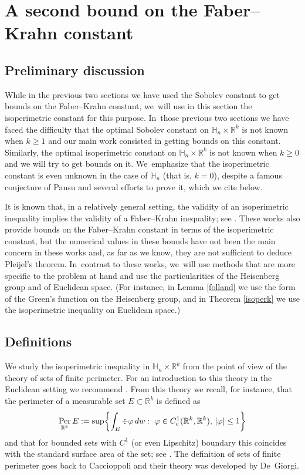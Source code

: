 \documentclass[10pt]{amsart}
\newcommand{\rc}{\textup{c}}
\theoremstyle{definition}
\let\phi\varphi
\newcommand{\1}{\mathbbm{1}}
\newcommand{\R}{\mathbb{R}}
\DeclareMathOperator{\per}{Per}
\begin{document}
\section{A second bound on the Faber--Krahn constant}\label{sec:isoperimetric}

\subsection{Preliminary discussion}
While in the previous two sections we have used the Sobolev constant to get bounds on the Faber--Krahn constant, we~will use in this section the isoperimetric constant for this purpose. In~those previous two sections we have faced the difficulty that the optimal Sobolev constant on $\mathbb H_n\times\R^k$ is not known when $k\geq 1$ and our main work consisted in getting bounds on this constant. Similarly, the optimal isoperimetric constant on $\mathbb H_n\times\R^k$ is not known when $k\geq 0$ and we will try to get bounds on it. We~emphasize that the isoperimetric constant is even unknown in the case of $\mathbb H_n$ (that is, $k=0$), despite a famous conjecture of Pansu \cite{Pa2} and several efforts to prove it, which we cite below.

It is known that, in a relatively general setting, the validity of an isoperimetric inequality implies the validity of a Faber--Krahn inequality; see \cite{Car,BaCoLeSC,Va}. These works also provide bounds on the Faber--Krahn constant in terms of the isoperimetric constant, but the numerical values in these bounds have not been the main concern in these works and, as far as we know, they are not sufficient to deduce Pleijel's theorem. In~contrast to these works, we~will use methods that are more specific to the problem at hand and use the particularities of the Heisenberg group and of Euclidean space. (For instance, in Lemma \ref{folland} we use the form of the Green's function on the Heisenberg group, and in Theorem \ref{isoperk} we use the isoperimetric inequality on Euclidean space.)

\subsection{Definitions}
We study the isoperimetric inequality in $\mathbb H_n\times\R^k$ from the point of view of the theory of sets of finite perimeter. For an introduction to this theory in the Euclidean setting we recommend \cite{Ma}. From this theory we recall, for instance, that the perimeter of a measurable set $E\subset\R^k$ is defined as
\[
\per_{\R^k} E := \sup \biggl\{ \int_E \div \phi \,dw :\ \phi\in C^1_\rc(\R^k,\R^k),\,|\phi|\leq 1\biggr\}
\]
and that for bounded sets with $C^1$ (or even Lipschitz) boundary this coincides with the standard surface area of the set; see \cite[Ex.\,12.5 \& 12.6]{Ma}. The definition of sets of finite perimeter goes back to Caccioppoli and their theory was developed by De~Giorgi.
\end{document}

